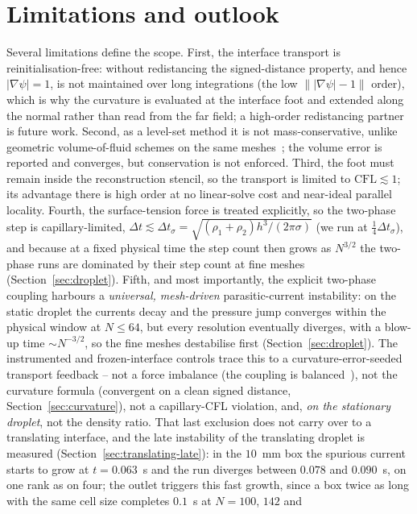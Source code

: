 \documentclass[preprint,3p,11pt]{elsarticle}
\newcommand{\psilev}{\psi}                       %
\newcommand{\gradpsi}{\lvert\nabla\psilev\rvert}
\begin{document}
\section{Limitations and outlook}
\label{sec:limitations}
Several limitations define the scope. First, the interface transport is
reinitialisation-free: without redistancing the signed-distance property, and hence
$\gradpsi=1$, is not maintained over long integrations (the low
$\bigl\|\gradpsi-1\bigr\|$ order), which is why the curvature is evaluated at the
interface foot and extended along the normal rather than read from the far field; a
high-order redistancing partner is future work. Second, as a level-set method it is not
mass-conservative, unlike geometric volume-of-fluid schemes on the same
meshes~\cite{roenby2016,maric2020}; the volume error is reported and converges, but
conservation is not enforced. Third, the foot must remain inside the reconstruction
stencil, so the transport is limited to $\mathrm{CFL}\!\lesssim\!1$; its advantage there
is high order at no linear-solve cost and near-ideal parallel locality. Fourth, the
surface-tension force is treated explicitly, so the two-phase step is capillary-limited,
$\Delta t\lesssim\Delta t_\sigma=\sqrt{(\rho_1+\rho_2)h^{3}/(2\pi\sigma)}$ (we run at
$\tfrac14\Delta t_\sigma$), and because at a fixed physical time the step count then grows
as $N^{3/2}$ the two-phase runs are dominated by their step count at fine meshes
(Section~\ref{sec:droplet}). Fifth, and most importantly, the explicit two-phase coupling harbours a
\emph{universal, mesh-driven} parasitic-current instability: on the static droplet the currents decay
and the pressure jump converges within the physical window at $N\le64$, but every resolution
eventually diverges, with a blow-up time $\sim N^{-3/2}$, so the fine meshes destabilise first
(Section~\ref{sec:droplet}). The instrumented and frozen-interface controls trace this to a
curvature-error-seeded transport feedback -- not a force imbalance (the coupling is
balanced~\cite{francois2006}), not the curvature formula (convergent on a clean signed distance,
Section~\ref{sec:curvature}), not a capillary-CFL violation, and, \emph{on the stationary droplet}, not the density ratio.
That last exclusion does not carry over to a translating interface, and the late
instability of the translating droplet is measured (Section~\ref{sec:translating-late}): in
the $10$~mm box the spurious current starts to grow at $t=0.063$~s and the run diverges
between $0.078$ and $0.090$~s, on one rank as on four; the outlet triggers this fast growth,
since a box twice as long with the same cell size completes $0.1$~s at $N=100$, $142$ and
\end{document}
